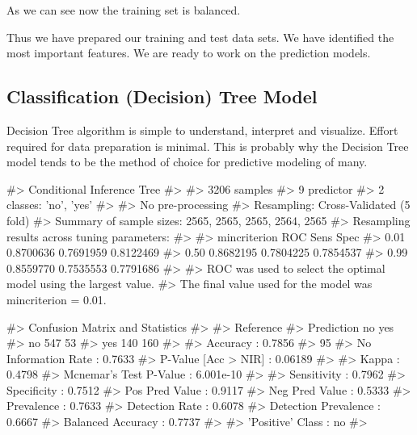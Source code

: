 As we can see now the training set is balanced.

Thus we have prepared our training and test data sets. We have
identified the most important features. We are ready to work on the
prediction models.

\hypertarget{classification-decision-tree-model}{%
\subsection{Classification (Decision) Tree
Model}\label{classification-decision-tree-model}}

Decision Tree algorithm is simple to understand, interpret and
visualize. Effort required for data preparation is minimal. This is
probably why the Decision Tree model tends to be the method of choice
for predictive modeling of many.

\begin{Schunk}
\begin{Soutput}
#> Conditional Inference Tree 
#> 
#> 3206 samples
#>    9 predictor
#>    2 classes: 'no', 'yes' 
#> 
#> No pre-processing
#> Resampling: Cross-Validated (5 fold) 
#> Summary of sample sizes: 2565, 2565, 2565, 2564, 2565 
#> Resampling results across tuning parameters:
#> 
#>   mincriterion  ROC        Sens       Spec     
#>   0.01          0.8700636  0.7691959  0.8122469
#>   0.50          0.8682195  0.7804225  0.7854537
#>   0.99          0.8559770  0.7535553  0.7791686
#> 
#> ROC was used to select the optimal model using the largest value.
#> The final value used for the model was mincriterion = 0.01.
\end{Soutput}
\end{Schunk}

\begin{Schunk}
\begin{Soutput}
#> Confusion Matrix and Statistics
#> 
#>           Reference
#> Prediction  no yes
#>        no  547  53
#>        yes 140 160
#>                                          
#>                Accuracy : 0.7856         
#>                  95%
#>     No Information Rate : 0.7633         
#>     P-Value [Acc > NIR] : 0.06189        
#>                                          
#>                   Kappa : 0.4798         
#>  Mcnemar's Test P-Value : 6.001e-10      
#>                                          
#>             Sensitivity : 0.7962         
#>             Specificity : 0.7512         
#>          Pos Pred Value : 0.9117         
#>          Neg Pred Value : 0.5333         
#>              Prevalence : 0.7633         
#>          Detection Rate : 0.6078         
#>    Detection Prevalence : 0.6667         
#>       Balanced Accuracy : 0.7737         
#>                                          
#>        'Positive' Class : no             
#> 
\end{Soutput}
\end{Schunk}

